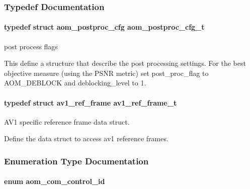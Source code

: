 \subsubsection{Typedef Documentation}
\paragraph[{\texorpdfstring{aom\+\_\+postproc\+\_\+cfg\+\_\+t}{aom_postproc_cfg_t}}]{\setlength{\rightskip}{0pt plus 5cm}typedef struct {\bf aom\+\_\+postproc\+\_\+cfg}  {\bf aom\+\_\+postproc\+\_\+cfg\+\_\+t}}\hypertarget{group__aom_gaf8a9b796d86228c9badeee6f13e5196b}{}\label{group__aom_gaf8a9b796d86228c9badeee6f13e5196b}


post process flags 

This define a structure that describe the post processing settings. For the best objective measure (using the P\+S\+NR metric) set post\+\_\+proc\+\_\+flag to A\+O\+M\+\_\+\+D\+E\+B\+L\+O\+CK and deblocking\+\_\+level to 1. 
\paragraph[{\texorpdfstring{av1\+\_\+ref\+\_\+frame\+\_\+t}{av1_ref_frame_t}}]{\setlength{\rightskip}{0pt plus 5cm}typedef struct {\bf av1\+\_\+ref\+\_\+frame}  {\bf av1\+\_\+ref\+\_\+frame\+\_\+t}}\hypertarget{group__aom_ga8de31c9dd61cb25763c30066885fc9b6}{}\label{group__aom_ga8de31c9dd61cb25763c30066885fc9b6}


A\+V1 specific reference frame data struct. 

Define the data struct to access av1 reference frames. 

\subsubsection{Enumeration Type Documentation}
\paragraph[{\texorpdfstring{aom\+\_\+com\+\_\+control\+\_\+id}{aom_com_control_id}}]{\setlength{\rightskip}{0pt plus 5cm}enum {\bf aom\+\_\+com\+\_\+control\+\_\+id}}\hypertarget{group__aom_ga9421a1fa78c0d9587ae5aa6c1cb3d659}{}\label{group__aom_ga9421a1fa78c0d9587ae5aa6c1cb3d659}


